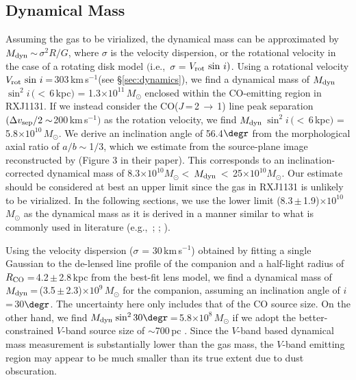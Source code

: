 \documentclass[]{emulateapj}
\newcommand{\Msun}{\mbox{$M_{\odot}$}\xspace}
\newcommand{\rarr}{$\rightarrow$}
\newcommand{\bco}{\mbox{CO($J$\,=\,2\,\rarr\,1)}\xspace}
\newcommand{\kms}{\mbox{km\,s$^{-1}$}\xspace}
\newcommand{\E}[1]{\mbox{$\times10^{#1}$}}
\newcommand{\eq}{\,=\,}
\newcommand{\ssim}{\,$\sim$\,}
\newcommand{\pmm}{\,$\pm$\,}
\newcommand{\eg}{{e.g.,~}}
\newcommand{\ie}{{i.e.,~}}
\newcommand{\Sec}[1]{\S\ref{sec:#1}}
\begin{document}
\subsection{Dynamical Mass}\label{sec:dyn}
Assuming the gas to be virialized,
the dynamical mass can be approximated by
$M_{\rm dyn}$\ssim$\sigma^2 R / G$,
where $\sigma$ is the velocity dispersion, or the rotational velocity in the case of a rotating disk model
$($\ie $\sigma$ = $V_{\rm rot}\, \sin\, i)$.
Using a rotational velocity $V_{\rm rot} \, \sin\, i$\,=\,303\,\kms (see \Sec{dynamics}),
we find a dynamical mass of
$M_{\rm dyn}$\,$\sin^2 i$\,$(<$\,6\,kpc$)$ = 1.3\E{11}\,\Msun enclosed
within the CO-emitting region in RXJ1131.
If we instead consider the
\bco line peak separation $(\Delta v_{\rm sep}/2 \sim$200\,\kms$)$ as the rotation velocity, we find
$M_{\rm dyn}$\,$\sin^2 i$\,$(<$\,6\,kpc$)$ = 5.8\E{10}\,\Msun.
We derive an inclination angle of 56.4$\degr$ from the
morphological axial ratio of $a/b\sim$1$/$3, which we estimate
from the source-plane image reconstructed by  (Figure 3 in their paper).
This corresponds to an inclination-corrected dynamical mass of
8.3\E{10}\Msun$<$\,$M_{\rm dyn}$\,$<$\,25\E{10}\Msun.
Our estimate should be considered at best an upper limit since
the gas in RXJ1131 is unlikely to be virialized.
In the following sections, we use the
lower limit (8.3\pmm1.9)\E{10}\,\Msun as the dynamical mass as it is
derived in a manner similar to what is commonly used in literature
(\eg \citealt[hereafter S97]{Solomon97a}; \citealt[hereafter DS98]{Downes98a}; \citealt[hereafter G05]{Greve05a}).

Using the velocity dispersion ($\sigma$ = 30\,\kms) obtained by fitting a single Gaussian to the
de-lensed line profile of the companion and a
half-light radius of $R_{\rm CO}$\,=\,4.2\pmm2.8\,kpc from the best-fit lens model,
we find a dynamical mass of
$M_{\rm dyn}$\,=\,(3.5\pmm2.3)\E{9}\,\Msun for the companion,
assuming an inclination angle of $i$\eq30$\degr$.
The uncertainty here only includes that of the CO source size.
On the other hand,
we find $M_{\rm dyn}$\,$\sin^2 30\degr$\,=\,5.8\E{8}\,\Msun
if we adopt the better-constrained $V$-band source size of $\sim$700\,pc .
Since the $V$-band based dynamical mass measurement is substantially lower than the gas mass,
the $V$-band emitting region may appear to be much smaller than its true extent due
to dust obscuration.
\end{document}
